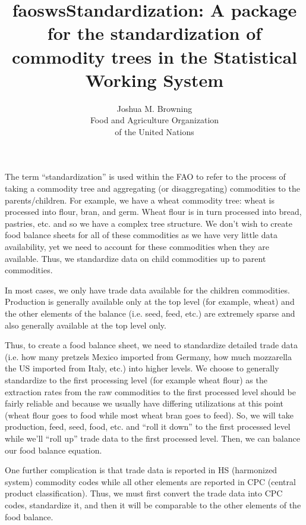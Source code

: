 \documentclass[nojss]{jss}
\title{\bf faoswsStandardization: A package for the standardization of commodity trees in the Statistical Working System}
\author{Joshua M. Browning\\ Food and Agriculture
    Organization \\ of the United Nations\\}
\begin{document}


\begin{section}

The term ``standardization'' is used within the FAO to refer to the process of taking a commodity tree and aggregating (or disaggregating) commodities to the parents/children.  For example, we have a wheat commodity tree: wheat is processed into flour, bran, and germ.  Wheat flour is in turn processed into bread, pastries, etc. and so we have a complex tree structure.  We don't wish to create food balance sheets for all of these commodities as we have very little data availability, yet we need to account for these commodities when they are available.  Thus, we standardize data on child commodities up to parent commodities.

In most cases, we only have trade data available for the children commodities.  Production is generally available only at the top level (for example, wheat) and the other elements of the balance (i.e. seed, feed, etc.) are extremely sparse and also generally available at the top level only.

Thus, to create a food balance sheet, we need to standardize detailed trade data (i.e. how many pretzels Mexico imported from Germany, how much mozzarella the US imported from Italy, etc.) into higher levels.  We choose to generally standardize to the first processing level (for example wheat flour) as the extraction rates from the raw commodities to the first processed level should be fairly reliable and because we usually have differing utilizations at this point (wheat flour goes to food while most wheat bran goes to feed).  So, we will take production, feed, seed, food, etc. and ``roll it down'' to the first processed level while we'll ``roll up'' trade data to the first processed level.  Then, we can balance our food balance equation.

One further complication is that trade data is reported in HS (harmonized system) commodity codes while all other elements are reported in CPC (central product classification).  Thus, we must first convert the trade data into CPC codes, standardize it, and then it will be comparable to the other elements of the food balance.

\begin{Schunk}
\end{Schunk}


\end{section}
\end{document}
